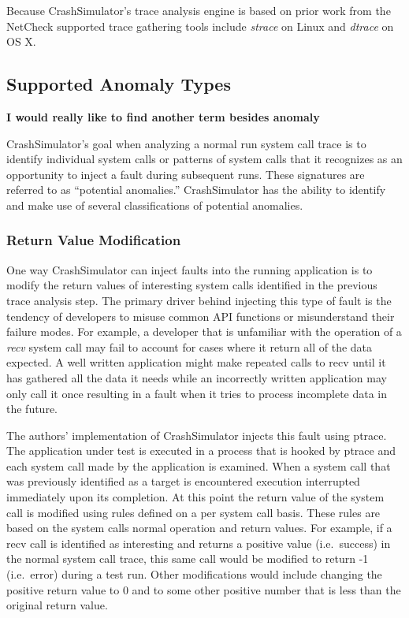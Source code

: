         Because CrashSimulator's trace analysis engine is based on prior work from the NetCheck supported trace
        gathering tools include \emph{strace} on Linux and \emph{dtrace} on OS X.


    \subsection{Supported Anomaly Types}

        \textbf{I would really like to find another term besides anomaly}

        CrashSimulator's goal when analyzing a normal run system call trace is to identify individual system calls or
        patterns of system calls that it recognizes as an opportunity to inject a fault during subsequent runs. These
        signatures are referred to as ``potential anomalies.'' CrashSimulator has the ability to identify and make use
        of several classifications of potential anomalies.

        \subsubsection{Return Value Modification}

            One way CrashSimulator can inject faults into the running application is to modify the return values of
            interesting system calls identified in the previous trace analysis step. The primary driver behind injecting
            this type of fault is the tendency of developers to misuse common API functions or misunderstand their
            failure modes. For example, a developer that is unfamiliar with the operation of a \emph{recv} system call
            may fail to account for cases where it return all of the data expected. A well written application might
            make repeated calls to recv until it has gathered all the data it needs while an incorrectly written
            application may only call it once resulting in a fault when it tries to process incomplete data in the
            future.

            The authors' implementation of CrashSimulator injects this fault using ptrace. The application under test is
            executed in a process that is hooked by ptrace and each system call made by the application is examined.
            When a system call that was previously identified as a target is encountered execution interrupted
            immediately upon its completion. At this point the return value of the system call is modified using rules
            defined on a per system call basis. These rules are based on the system calls normal operation and return
            values. For example, if a recv call is identified as interesting and returns a positive value (i.e.\ success)
            in the normal system call trace, this same call would be modified to return -1 (i.e.\ error) during a test
            run. Other modifications would include changing the positive return value to 0 and to some other positive
            number that is less than the original return value.


